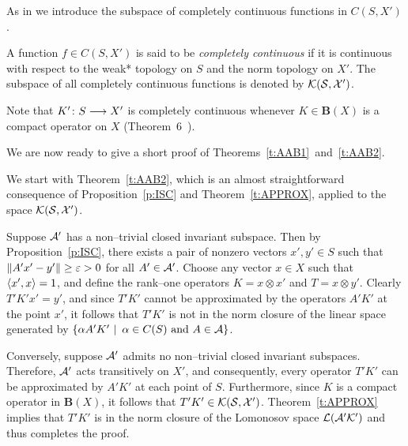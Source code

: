 \medskip

As in \cite{AAB95} we introduce the subspace of completely continuous
functions in $C(S,X')$.

\begin{defn}
A function $f\in C(S,X')$ is said to be {\em completely continuous} if it is
continuous with respect to the weak* topology on $S$ and the norm topology on
$X'$. The subspace of all completely continuous functions is denoted by $\cal
K(S,X')$.
\end{defn}

Note that $K'\colon S \longrightarrow X'$ is completely continuous whenever
$K\in\mathbf{B}(X)$ is a compact operator on $X$
(Theorem~6~\cite[p.\,486]{DS57}).

\medskip

We are now ready to give a short proof of
Theorems~\ref{t:AAB1}~and~\ref{t:AAB2}.

\medskip
\goodbreak


\bigskip

We start with Theorem~\ref{t:AAB2}, which is an almost straightforward
consequence of Proposition~\ref{p:ISC} and Theorem~\ref{t:APPROX}, applied to
the space $\cal K(S,X')$.

\medskip

Suppose ${\cal A}'$ has a non--trivial closed  invariant subspace. Then by
Proposition~\ref{p:ISC}, there exists a pair of nonzero vectors $x',y' \in S$
such that $\left\Vert A'x' - y'\right\Vert \geq \varepsilon > 0$ for all $A'\in{\cal A}'$. Choose any
vector $x \in X$ such that $\left<x',x\right>=1$, and define the rank--one operators
$K=x\otimes x'$ and $T=x\otimes y'$. Clearly $T'K'x' = y'$, and since $T'K'$
cannot be approximated by the operators $A'K'$ at the point $x'$, it follows
that $T'K'$ is not in the norm closure of the linear space generated by
$\left\{ \alpha A' K'\,\,|\,\,\, \alpha \in C(S) \text{ and } A \in {\cal A}\right\}$.

\smallskip

Conversely, suppose ${\cal A}'$ admits no non--trivial closed invariant subspaces.
Therefore, ${\cal A}'$ acts transitively on $X'$, and consequently, every operator
$T'K'$ can be approximated by $A'K'$ at each point of $S$. Furthermore, since
$K$ is a compact operator in $\mathbf{B}(X)$, it follows that $T'K' \in \cal
K(S,X')$. Theorem~\ref{t:APPROX} implies that $T'K'$ is in the norm closure
of the Lomonosov space $\cal{L}({\cal A}'K')$ and thus completes the proof.

